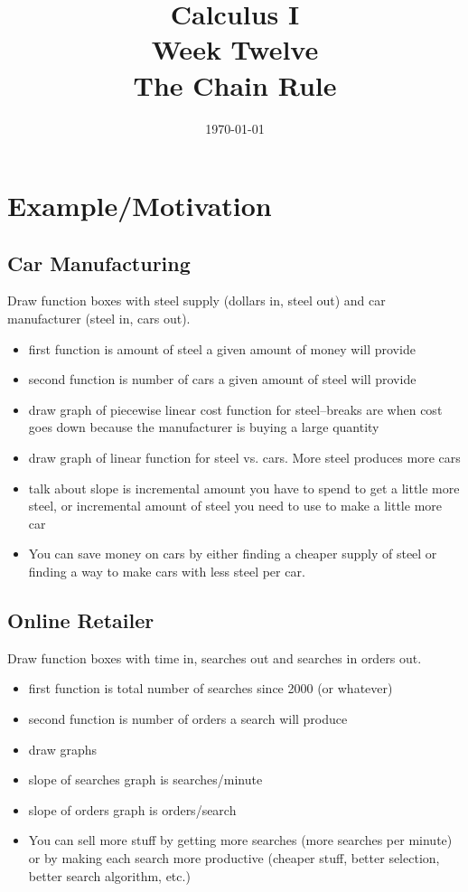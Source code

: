 \documentclass[letterpaper, landscape]{exam}
\author{}
\date{\today}
\title{Calculus I \\ Week Twelve \\ The Chain Rule}
\begin{document}
  \maketitle
  \tableofcontents

  \newpage 

  \section{Example/Motivation} %

  \subsection{Car Manufacturing} %
  
  Draw function boxes with steel supply (dollars in, steel out) and car manufacturer (steel in, cars
  out).

  \begin{itemize}
    \item first function is amount of steel a given amount of money will provide
    \item second function is number of cars a given amount of steel will provide
    \item draw graph of piecewise linear cost function for steel--breaks are when cost goes down
      because the manufacturer is buying a large quantity
    \item draw graph of linear function for steel vs. cars. More steel produces more cars
    \item talk about slope is incremental amount you have to spend to get a little more steel, or
      incremental amount of steel you need to use to make a little more car
    \item You can save money on cars by either finding a cheaper supply of steel or finding a way to
      make cars with less steel per car.
  \end{itemize}

  \subsection{Online Retailer} %
  
  Draw function boxes with time in, searches out and searches in orders out.

  \begin{itemize}
    \item first function is total number of searches since 2000 (or whatever)
    \item second function is number of orders a search will produce
    \item draw graphs 
    \item slope of searches graph is searches/minute
    \item slope of orders graph is orders/search
    \item You can sell more stuff by getting more searches (more searches per minute) or by making
      each search more productive (cheaper stuff, better selection, better search algorithm, etc.)
  \end{itemize}
\end{document}
